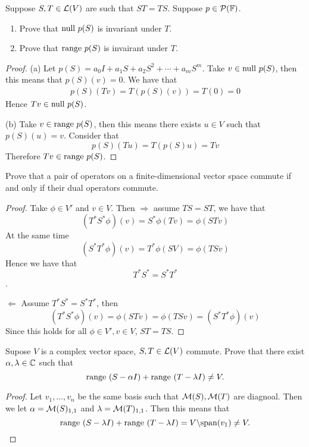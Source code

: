 \documentclass{extarticle}
\begin{document}
\begin{problem}{3}
    Suppose \(S, T \in \mathcal{L}(V)\) are such that \(ST = TS\). Suppose \(p \in \mathcal{P}(\mathbb{F})\). 
    \begin{enumerate}[label=(\alph*)]
        \item Prove that \(\text{null } p(S)\) is invariant under \(T\). 
        \item Prove that \(\text{range } p(S)\) is invairant under \(T\).
    \end{enumerate}
\end{problem}


\begin{proof}
(a) Let \(p(S) = a_0I + a_1 S + a_2 S^2 + \cdots + a_m S^m\). Take \(v \in \text{null } p(S)\), then this means that 
\(p(S)(v) = 0\). We have that 
\begin{align*}
    p(S)(Tv) = T(p(S)(v)) = T(0) = 0 
\end{align*}
Hence \(Tv \in \text{null } p(S)\). 

(b) Take \(v \in \text{range } p(S)\), then this means there exists \(u \in V\) such that \(p(S)(u) = v\). Consider that 
\[p(S)(Tu) = T(p(S)u) = Tv\]
Therefore \(Tv \in \text{range } p(S)\).
\end{proof}



\begin{problem}{5}
    Prove that a pair of operators on a finite-dimensional vector space commute if and only if 
    their dual operators commute.
\end{problem}

\begin{proof}
Take \(\phi \in V'\) and \(v \in V\). Then \(\Rightarrow\) assume \(TS = ST\), we have that 
\[(T^* S^* \phi)(v) = S^* \phi(Tv) = \phi (STv)\]
At the same time 
\[(S^*T^* \phi)(v) = T^* \phi (SV) = \phi (TSv)\]
Hence we have that \[T^*S^* = S^*T^*\]. 

\(\Leftarrow\) Assume \(T^* S^* = S^* T^*\), then 
\[(T^* S^* \phi)(v) = \phi(STv) = \phi (TSv) = (S^*T^* \phi)(v)\]
Since this holds for all \(\phi \in V', v \in V\), \(ST = TS\).
\end{proof}


\begin{problem}{6}
    Supose \(V\) is a complex vector space, \(S,T \in \mathcal{L}(V)\) commute. Prove that there exist 
    \(\alpha, \lambda \in \mathbb{C}\) such that 
    \[\text{range } (S - \alpha I) + \text{range } (T - \lambda I) \neq V.\]
\end{problem}

\begin{proof}
Let \(v_1, \ldots, v_n\) be the same basis such that \(\mathcal{M}(S), \mathcal{M}(T)\) are diagnoal. Then we let 
\(\alpha = \mathcal{M}(S)_{1,1}\) and \(\lambda = \mathcal{M}(T)_{1, 1}\). Then this means that 
\[\text{range } (S - \lambda I) + \text{range } (T - \lambda I) = V \backslash\text{span}(v_1) \neq V.\]
\end{proof}
\end{document}
